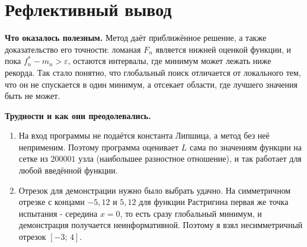 \documentclass[a4paper,12pt]{article}
\begin{document}
\section{Рефлективный вывод}

\textbf{Что оказалось полезным.} Метод даёт приближённое решение, а также доказательство его точности: ломаная $F_n$ является нижней оценкой функции, и пока $f^*_n - m_n > \varepsilon$, остаются интервалы, где минимум может лежать ниже рекорда. Так стало понятно, что глобальный поиск отличается от локального тем, что он не спускается в один минимум, а отсекает области, где лучшего значения быть не может.

\textbf{Трудности и как они преодолевались.}
\begin{enumerate}
\item На вход программы не подаётся константа Липшица, а метод без неё неприменим. Поэтому программа оценивает $L$ сама по значениям функции на сетке из $200001$ узла (наибольшее разностное отношение), и так работает для любой введённой функции.
\item Отрезок для демонстрации нужно было выбрать удачно. На симметричном отрезке с концами $-5{,}12$ и $5{,}12$ для функции Растригина первая же точка испытания - середина $x = 0$, то есть сразу глобальный минимум, и демонстрация получается неинформативной. Поэтому я взял несимметричный отрезок $[-3;\,4]$.
\end{enumerate}
\end{document}
